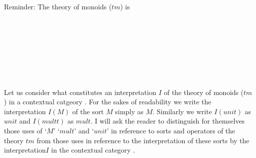 
\note
Reminder: The theory of monoids ($tm$) is
\begin{gatrules}
\gatintros
{}
 \\
 \\
 \\
\gataxioms

\begin{gatgroup}{}
 \\
\end{gatgroup} \\
\end{gatrules}
\note Let us consider what constitutes an interpretation $I$ of the theory of monoids ($tm$) in a contextual catgeory \catc.
For the sakes of readability we write the interpretation $I(M)$ of the sort $M$ simply as $M$. Similarly we write $I(unit)$ as $unit$ and $I(multt)$ as $mult$. I will ask the reader  to distinguish for themselves 
those uses of `$M$' `$mult$' and `$unit$' in reference to sorts and operators of the theory $tm$ from those uses in reference to the interpretation of these sorts by the interpretation$I$ in the contextual category \catc. 

\newcommand{\wM}{\ofT{w}{M}}
\newcommand{\xM}{\ofT{x_1, x_2}{M}}
\newcommand{\yM}{\ofT{y_1, y_2, y_3}{M}}
\newcommand{\doubleM}{M^2}                       %
\newcommand{\trebleM}{M^3}                       %
\newcommand{\quadM}{M^4}                         %
\newcommand{\spi}{s(p_{M^3,M^i})}
\newcommand{\sptrebleone}{s(p_{M^3,M^1})}
\newcommand{\sptrebletwo}{s(p_{M^3,M^2})}
\newcommand{\sptreblethree}{s(p_{M^3,M^3})}
\newcommand{\fmult}{m}  %

